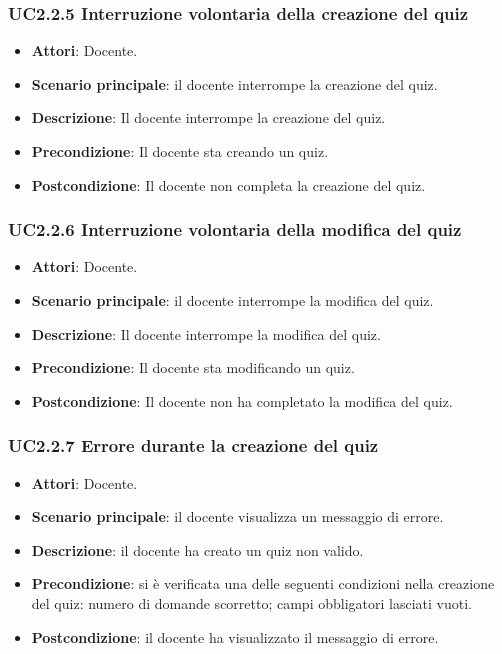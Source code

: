 \subsubsection{UC2.2.5 Interruzione volontaria della creazione del quiz}
\begin{itemize}
\item \textbf{Attori}: Docente.
\item \textbf{Scenario principale}: il docente interrompe la creazione del quiz.
\item \textbf{Descrizione}: Il docente interrompe la creazione del quiz.
\item \textbf{Precondizione}: Il docente sta creando un quiz.
\item \textbf{Postcondizione}: Il docente non completa la creazione del quiz.
\end{itemize}
\subsubsection{UC2.2.6 Interruzione volontaria della modifica del quiz}
\begin{itemize}
\item \textbf{Attori}: Docente.
\item \textbf{Scenario principale}: il docente interrompe la modifica del quiz.
\item \textbf{Descrizione}: Il docente interrompe la modifica del quiz.
\item \textbf{Precondizione}: Il docente sta modificando un quiz.
\item \textbf{Postcondizione}: Il docente non ha completato la modifica del quiz.
\end{itemize}
\subsubsection{UC2.2.7 Errore durante la creazione del quiz}
\begin{itemize}
\item \textbf{Attori}: Docente.
\item \textbf{Scenario principale}: il docente visualizza un messaggio di errore.
\item \textbf{Descrizione}: il docente ha creato un quiz non valido.
\item \textbf{Precondizione}: si è verificata una delle seguenti condizioni nella creazione del quiz: numero di domande scorretto; campi obbligatori lasciati vuoti.
\item \textbf{Postcondizione}: il docente ha visualizzato il messaggio di errore.
\end{itemize}
